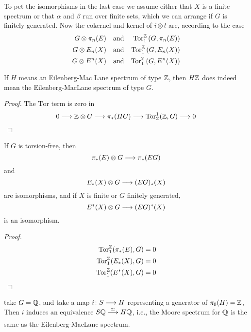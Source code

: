 \documentclass[../main]{subfiles}
\begin{document}
To pet the isomorphisms in the last case we assume either that $X$ is a finite spectrum or that $\alpha$ and $\beta$ run over finite sets, which we can arrange if $G$ is finitely generated. Now the cokernel and kernel of $i\otimes l$ are, according to the case
\begin{align}
    G\otimes \pi_n(E) && \text{and} && \mathrm{Tor}_1^{\mathbb{Z}} \left( G, \pi_n(E) \right) \nonumber \\
    G\otimes E_n(X) && \text{and} && \mathrm{Tor}_1^{\mathbb{Z}} \left( G, E_n(X) \right) \nonumber \\
    G\otimes E^n(X) && \text{and} && \mathrm{Tor}_1^{\mathbb{Z}} \left( G, E^n(X) \right) \nonumber
\end{align}

\begin{example}
If $H$ means an Eilenberg-Mac Lane spectrum of type $\mathbb{Z}$, then $H\mathbb{Z}$ does indeed mean the Eilenberg-MacLane spectrum of type $G$.
\end{example}

\begin{proof}
The $\mathrm{Tor}$ term is zero in
\[0\longrightarrow \mathbb{Z}\otimes G\longrightarrow \pi_\ast(HG)\longrightarrow \mathrm{Tor}_{\mathbb{Z}}^1(\mathbb{Z}, G)\longrightarrow 0\]
\end{proof}


\begin{proposition}\label{prop:p3c06.7}
If $G$ is torsion-free, then
\[\pi_\ast (E)\otimes G\longrightarrow \pi_\ast(EG)\]
and
\[E_\ast(X)\otimes G\longrightarrow (EG)_\ast(X)\]
are isomorphisms, and if $X$ is finite or $G$ finitely generated,
\[E^\ast(X)\otimes G\longrightarrow (EG)^\ast (X)\]
is an isomorphism.
\end{proposition}

\begin{proof}
\begin{align}
    \mathrm{Tor}_1^{\mathbb{Z}}(\pi_\ast(E), G) &= 0 \nonumber \\
    \mathrm{Tor}_1^{\mathbb{Z}}(E_\ast(X), G) &= 0 \nonumber \\
    \mathrm{Tor}_1^{\mathbb{Z}}(E^\ast(X), G) &= 0 \nonumber
\end{align}
\end{proof}

\begin{example}
take $G=\mathbb{Q}$, and take a map $i\colon S \longrightarrow H$ representing a generator of $\pi_0(H)=\mathbb{Z}$, Then $i$ induces an equivalence $S\bQ\vra{\simeq}H\bQ$, i.e., the Moore spectrum for $\mathbb{Q}$ is the same as the Eilenberg-MacLane spectrum.
\end{example}
\end{document}
